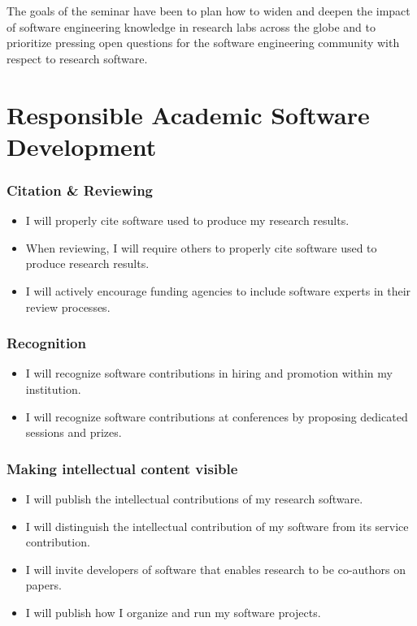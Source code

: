 \documentclass[a4paper,UKenglish]{dagman}
\renewcommand{\paragraph}[1]{\subsubsection*{#1}\xspace}
\begin{document}
The goals of the seminar have been to plan how to widen and deepen the impact of software engineering knowledge in research labs across the globe and to prioritize pressing open questions for the software engineering community with respect to research software.

\section{Responsible Academic Software Development}



\paragraph{Citation \& Reviewing}
\begin{itemize}
\item I will properly cite software used to produce my research results.
\item When reviewing, I will require others to properly cite software used to produce research results.
\item I will actively encourage funding agencies to include software experts in their review processes.
\end{itemize}

\paragraph{Recognition}
\begin{itemize}
\item I will recognize software contributions in hiring and promotion within my institution.
\item I will recognize software contributions at conferences by proposing dedicated sessions and prizes.
\end{itemize}

\paragraph{Making intellectual content visible}
\begin{itemize}
\item I will publish the intellectual contributions of my research software.
\item I will distinguish the intellectual contribution of my software from its service contribution.
\item I will invite developers of software that enables research to be co-authors on papers.
\item I will publish how I organize and run my software projects.
\end{itemize}
\end{document}
